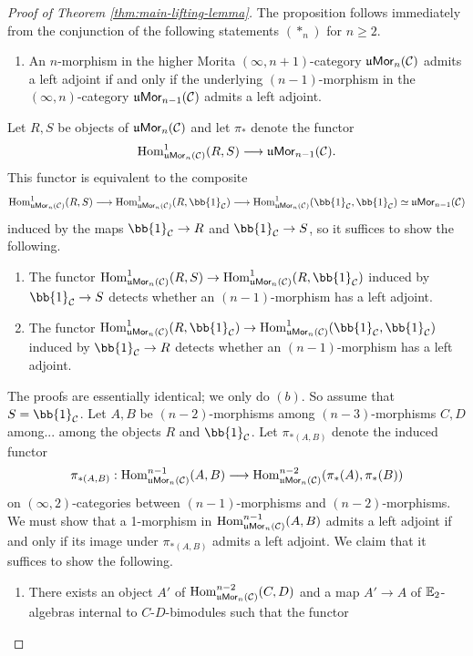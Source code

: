 \documentclass[10pt, reqno, twoside
, final
]{amsart}
\numberwithin{equation}{subsection}%
\theoremstyle{definition}
\theoremstyle{definition}
\theoremstyle{definition}
\theoremstyle{definition}
\theoremstyle{definition}
\theoremstyle{definition}
\theoremstyle{definition}
\theoremstyle{definition}
\theoremstyle{definition}
\theoremstyle{plain}
\theoremstyle{definition}
\theoremstyle{plain}
\theoremstyle{definition}
\theoremstyle{plain}
\theoremstyle{definition}
\theoremstyle{definition}
\theoremstyle{plain}
\theoremstyle{plain}
\theoremstyle{definition}
\theoremstyle{plain}
\theoremstyle{plain}
\theoremstyle{plain}
\begin{document}
\begin{proof}[Proof of Theorem \ref{thm:main-lifting-lemma}]
The proposition follows immediately from the conjunction of the following statements $(*_n)$ for $n\geq 2$.
\begin{enumerate}
    \item[$(*_n)$] An $n$-morphism in the higher Morita $(\infty,n+1)$-category $\mathfrak{u}\mathsf{Mor}_n(\mathcal{C})$ admits a left adjoint if and only if the underlying $(n-1)$-morphism in the $(\infty,n)$-category $\mathfrak{u}\mathsf{Mor}_{n-1}(\mathcal{C})$ admits a left adjoint.
\end{enumerate}
Let $R,S$ be objects of $\mathfrak{u}\mathsf{Mor}_n(\mathcal{C})$ and let $\pi_*$ denote the functor
\[ \mathrm{Hom}^1_{\mathfrak{u}\mathsf{Mor}_n(\mathcal{C})}(R,S) \longrightarrow \mathfrak{u}\mathsf{Mor}_{n-1}(\mathcal{C}).  \]
This functor is equivalent to the composite
\[ \Hom^1_{\umor_n(\icat)}(R,S) \longrightarrow \Hom^1_{\umor_n(\icat)}(R,\bb{1}_{\icat}) \longrightarrow  \Hom^1_{\umor_n(\icat)}(\bb{1}_{\icat},\bb{1}_{\icat}) \simeq \umor_{n-1}(\icat) \]
induced by the maps $\bb{1}_{\icat}\rightarrow R$ and $\bb{1}_{\icat}\rightarrow S$, so it suffices to show the following.
\begin{enumerate}[$(a)$]
    \item The functor $\Hom^1_{\umor_n(\icat)}(R,S) \rightarrow \Hom^1_{\umor_n(\icat)}(R,\bb{1}_{\icat})$ induced by $\bb{1}_{\icat}\rightarrow S$ detects whether an $(n-1)$-morphism has a left adjoint.
    \item The functor $\Hom^1_{\umor_n(\icat)}(R,\bb{1}_{\icat}) \rightarrow \Hom^1_{\umor_n(\icat)}(\bb{1}_{\icat},\bb{1}_{\icat})$ induced by $\bb{1}_{\icat}\rightarrow R$ detects whether an $(n-1)$-morphism has a left adjoint.
\end{enumerate}
The proofs are essentially identical; we only do $(b)$. So assume that $S=\bb{1}_{\icat}$. Let $A,B$ be $(n-2)$-morphisms among $(n-3)$-morphisms $C,D$ among... among the objects $R$ and $\bb{1}_{\icat}$. Let $\pi_{*(A,B)}$ denote the induced functor
\[ \pi_{*(A,B)}:\mathrm{Hom}^{n-1}_{\mathfrak{u}\mathsf{Mor}_n(\mathcal{C})}(A,B) \longrightarrow \mathrm{Hom}^{n-2}_{\mathfrak{u}\mathsf{Mor}_n(\mathcal{C})}(\pi_*(A),\pi_*(B))  \]
on $(\infty,2)$-categories between $(n-1)$-morphisms and $(n-2)$-morphisms. We must show that a 1-morphism in $\mathrm{Hom}^{n-1}_{\mathfrak{u}\mathsf{Mor}_n(\mathcal{C})}(A,B)$ admits a left adjoint if and only if its image under $\pi_{*(A,B)}$ admits a left adjoint. We claim that it suffices to show the following.
\begin{enumerate}
    \item[$(\bullet)$] There exists an object $A'$ of $\mathrm{Hom}_{\mathfrak{u}\mathsf{Mor}_n(\mathcal{C})}^{n-2}(C,D)$ and a map $A'\rightarrow A$ of $\mathbb{E}_{2}$-algebras internal to $C$-$D$-bimodules such that the functor 

\end{enumerate}
\end{proof}
\end{document}
